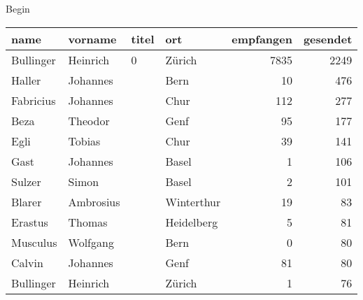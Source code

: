 \documentclass[10pt,a4paper,landscape]{article}
\begin{document}
Begin

\begin{longtable}{llllrr}
\toprule
                     name &                            vorname &       titel &                                         ort &  empfangen &  gesendet \\
\midrule
                Bullinger &                           Heinrich &           0 &                                      Zürich &       7835 &      2249 \\
                   Haller &                           Johannes &             &                                        Bern &         10 &       476 \\
                Fabricius &                           Johannes &             &                                        Chur &        112 &       277 \\
                     Beza &                            Theodor &             &                                        Genf &         95 &       177 \\
                     Egli &                             Tobias &             &                                        Chur &         39 &       141 \\
                     Gast &                           Johannes &             &                                       Basel &          1 &       106 \\
                   Sulzer &                              Simon &             &                                       Basel &          2 &       101 \\
                   Blarer &                          Ambrosius &             &                                  Winterthur &         19 &        83 \\
                  Erastus &                             Thomas &             &                                  Heidelberg &          5 &        81 \\
                 Musculus &                           Wolfgang &             &                                        Bern &          0 &        80 \\
                   Calvin &                           Johannes &             &                                        Genf &         81 &        80 \\
                Bullinger &                           Heinrich &             &                                      Zürich &          1 &        76 \\

\end{longtable}
\end{document}
